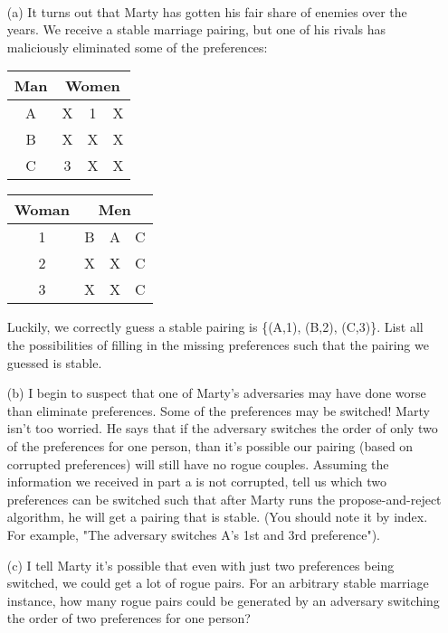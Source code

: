 \documentclass[11pt]{article}
\begin{document}
\begin{qunlist}
        
 \\
\begin{itemize}
\item[(a)] It turns out that Marty has gotten his fair share of enemies over the years. We receive a stable marriage pairing, but one of his rivals has maliciously eliminated some of the preferences:

\begin{center}
\begin{tabular}{|c|ccc|}\hline 
Man&\multicolumn{3}{|c|}{Women}\\\hline 
A&X&1&X\\\hline 
B&X&X&X\\\hline 
C&3&X&X\\\hline
\end{tabular} 
\hspace{2cm}
\begin{tabular}{|c|ccc|}\hline 
Woman&\multicolumn{3}{|c|}{Men}\\\hline 
1&B&A&C\\\hline 
2&X&X&C\\\hline 
3&X&X&C\\\hline
\end{tabular}
\end{center}
        
        Luckily, we correctly guess a stable pairing is \{(A,1), (B,2), (C,3)\}. List all the possibilities of filling in the missing preferences such that the pairing we guessed is stable. 
        
\item[(b)] I begin to suspect that one of Marty's adversaries may have done worse than eliminate preferences. Some of the preferences may be switched! Marty isn't too worried. He says that if the adversary switches the order of only two of the preferences for one person, than it's possible our pairing (based on corrupted preferences) will still have no rogue couples. Assuming the information we received in part a is not corrupted, tell us which two preferences can be switched such that after Marty runs the propose-and-reject algorithm, he will get a pairing that is stable. (You should note it by index. For example, "The adversary switches A's 1st and 3rd preference").
        
\item[(c)] I tell Marty it's possible that even with just two preferences being switched, we could get a lot of rogue pairs. For an arbitrary stable marriage instance, how many rogue pairs could be generated by an adversary switching the order of two preferences for one person?
        

\end{itemize}
\end{qunlist}
\end{document}
